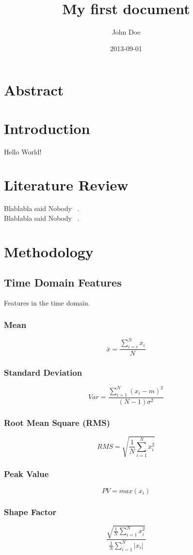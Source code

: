 \documentclass{article}
\title{My first document}
\date{2013-09-01}
\author{John Doe}
\begin{document}
  \maketitle
  \newpage
  \tableofcontents
  \newpage
  \section{Abstract}
  
  
  \newpage
  \section{Introduction}
  Hello World!

  \newpage  
  \section{Literature Review}
  Blablabla said Nobody ~\cite{caesarendra2017review}.\\
  Blablabla said Nobody ~\cite{soualhi2021novel}.

  \newpage  
  \section{Methodology}
  \subsection{Time Domain Features}
  Features in the time domain.
  \subsubsection{Mean}
  $$ \bar{x} = \frac{\sum^N_{i=i} x_i}{N} $$
  \subsubsection{Standard Deviation}  
  $$ Var =\frac{\sum^N_{i=1}(x_i-m)^2}{(N-1)\sigma^2} $$
  \subsubsection{Root Mean Square (RMS)}
  $$ RMS = \sqrt{\frac{1}{N} \sum^N_{i=1}x^2_i} $$
  \subsubsection{Peak Value}
  $$ PV = max(x_i) $$ 
  \subsubsection{Shape Factor} 
  $$ \frac{ \sqrt{\frac{1}{N} \sum^N_{i=1}x_i^2} }  {\frac{1}{N}\sum^N_{i=1}|x_i|} $$
\end{document}
